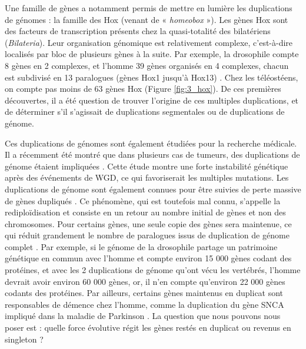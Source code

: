 \par Une famille de gènes a notamment permis de mettre en lumière les duplications de génomes : la famille des Hox (venant de « \textit{homeobox} »). Les gènes Hox sont des facteurs de transcription présents chez la quasi-totalité des bilatériens (\textit{Bilateria}). Leur organisation génomique est relativement complexe, c’est-à-dire localisés par bloc de plusieurs gènes à la suite. Par exemple, la drosophile compte 8 gènes en 2 complexes, et l’homme 39 gènes organisés en 4 complexes, chacun est subdivisé en 13 paralogues (gènes Hox1 jusqu’à Hox13) \parencite{hoegg_hox_2005, meyer_vertebrate_1999, rux_hox_2017}. Chez les téléostéens, on compte pas moins de 63 gènes Hox \parencite{meyer_vertebrate_1999, stellwag_hox_1999} (Figure \ref{fig:3_hox}). De ces premières découvertes, il a été question de trouver l’origine de ces multiples duplications, et de déterminer s’il s’agissait de duplications segmentales ou de duplications de génome. 
\par Ces duplications de génomes sont également étudiées pour la recherche médicale. Il a récemment été montré que dans plusieurs cas de tumeurs, des duplications de génome étaient impliquées \parencite{gemble_genetic_2022}. Cette étude montre une forte instabilité génétique après des événements de WGD, ce qui favoriserait les multiples mutations. 
Les duplications de génome sont également connues pour être suivies de perte massive de gènes dupliqués \parencite{inoue_rapid_2015, jaillon_genome_2004}. Ce phénomène, qui est toutefois mal connu, s’appelle la rediploïdisation et consiste en un retour au nombre initial de gènes et non des chromosomes. Pour certains gènes, une seule copie des gènes sera maintenue, ce qui réduit grandement le nombre de paralogues issus de duplication de génome complet \parencite{byrne_yeast_2005}. Par exemple, si le génome de la drosophile partage un patrimoine génétique en commun avec l’homme et compte environ 15 000 gènes codant des protéines, et avec les 2 duplications de génome qu’ont vécu les vertébrés, l’homme devrait avoir environ 60 000 gènes, or, il n’en compte qu’environ 22 000 gènes codants des protéines. Par ailleurs, certains gènes maintenus en duplicat sont responsables de démence chez l’homme, comme la duplication du gène SNCA impliqué dans la maladie de Parkinson \parencite{chartier-harlin_alpha-synuclein_2004, ibanez_causal_2004}. 
La question que nous pouvons nous poser est : quelle force évolutive régit les gènes restés en duplicat ou revenus en singleton ? 

